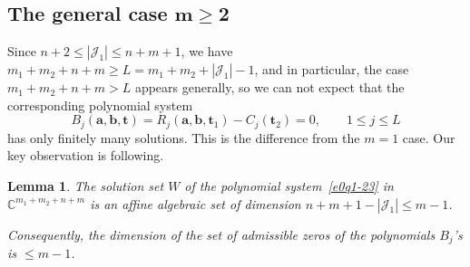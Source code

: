 \documentclass[10pt,a4paper]{amsart}
\numberwithin{equation}{section}
\newtheorem{Lemma}[Theorem]{Lemma}
\def\C{\mathbb C}
\begin{document}












%








\subsection[The general case m geq 2]{The general case $\boldsymbol{m\geq 2}$}


Since $n+2\leq |\mathcal{J}_1|\leq n+m+1$, we have $m_1+m_2+n+m\geq L=m_1+m_2+|\mathcal{J}_1|-1$, and in particular, the case $m_1+m_2+n+m>L$ appears generally, so we can not expect that the corresponding polynomial system
\begin{equation}
\label{e0q1-23}
B_j(\boldsymbol a,\boldsymbol b,\boldsymbol t)=R_j(
\boldsymbol a,\boldsymbol b,\boldsymbol t_1)-C_j(\boldsymbol t_2)=0,
\qquad 1\leq j\leq L
\end{equation}
has only finitely many solutions. This is the difference from the $m=1$ case.
Our key observation is following.

\begin{Lemma}\label{00lemm3-4}
The solution set $W$ of the polynomial system~\eqref{e0q1-23}
 in $\C^{m_1+m_2+n+m}$ is an affine algebraic set of dimension
 $n+m+1-|\mathcal{J}_1|\leq m-1$.

 Consequently, the dimension of the set of admissible zeros of the
 polynomials $B_j$'s is $\leq m-1$.
\end{Lemma}
\end{document}
